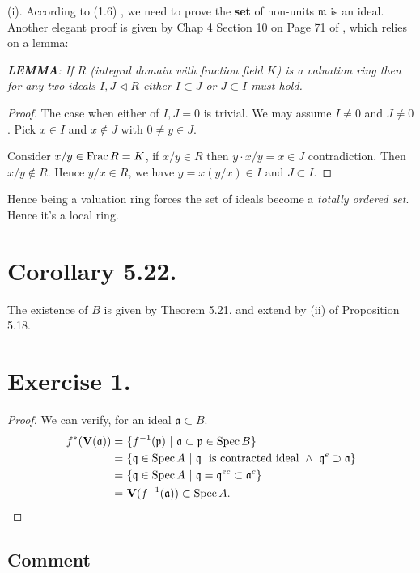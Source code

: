 (i). According to (1.6) \cite{atiyah1994introduction}, we need to prove the \textbf{set} of non-units $\mathfrak m$  is an ideal. Another elegant proof is given by Chap 4 Section 10 on Page 71 of \cite{matsumura1989commutative}, which relies on a lemma: 

\textit{\textbf{LEMMA}: If $R$ (integral domain with fraction field $K$) is a valuation ring then for any two ideals $I,J\triangleleft R$ either $I\subset J$ or $J\subset I$ must hold.}
\begin{proof}
	The case when either of $I,J=0$ is trivial. We may assume $I\neq 0$ and $J\neq 0$. Pick $x\in I$ and $x\notin J$ with $0\neq y\in J$. 

	Consider $x/y\in \operatorname{Frac} R=K$, if $x/y\in R$ then $y\cdot x/y=x\in J$ contradiction. Then $x/y\notin R$. Hence $y/x\in R$, we have $y=x(y/x)\in I$ and $J\subset I$.
\end{proof}

Hence being a valuation ring forces the set of ideals become a \textit{totally ordered set}. Hence it's a local ring.

\section{Corollary 5.22.}

The existence of $B$ is given by Theorem 5.21. and extend by (ii) of Proposition 5.18.

\section{Exercise 1.}

\begin{proof}
	We can verify, for an ideal $\mathfrak a\subset B$.
	\begin{align*}
		f^{\ast}(\mathbf V(\mathfrak a)) =&~ \{f^{-1}(\mathfrak p) ~\vert~ \mathfrak a\subset\mathfrak p\in \operatorname{Spec} B\}\\
		=&~ \{\mathfrak q\in \operatorname{Spec} A ~\vert~ \mathfrak q ~\text{ is contracted ideal}~ \land~ \mathfrak q^e\supset \mathfrak a \}\\
		=&~ \{\mathfrak q\in \operatorname{Spec} A ~\vert~ \mathfrak q=\mathfrak q^{ec}\subset \mathfrak a^c\}\\
		=&~ \mathbf V(f^{-1}(\mathfrak a))\subset \operatorname{Spec} A.	
	\end{align*}
\end{proof}
\subsection{Comment}



